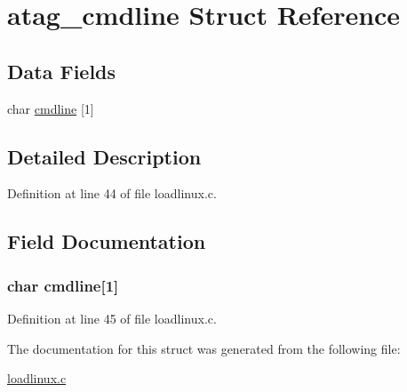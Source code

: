 \hypertarget{structatag__cmdline}{\section{atag\-\_\-cmdline \-Struct \-Reference}
\label{structatag__cmdline}
}
\subsection*{\-Data \-Fields}
\begin{DoxyCompactItemize}
\item 
char \hyperlink{structatag__cmdline_af65a749b1baeb0e29cd855abcac29905}{cmdline} \mbox{[}1\mbox{]}
\end{DoxyCompactItemize}


\subsection{\-Detailed \-Description}


\-Definition at line 44 of file loadlinux.\-c.



\subsection{\-Field \-Documentation}
\hypertarget{structatag__cmdline_af65a749b1baeb0e29cd855abcac29905}{
\subsubsection[{cmdline}]{\setlength{\rightskip}{0pt plus 5cm}char {\bf cmdline}\mbox{[}1\mbox{]}}}\label{structatag__cmdline_af65a749b1baeb0e29cd855abcac29905}


\-Definition at line 45 of file loadlinux.\-c.



\-The documentation for this struct was generated from the following file\-:\begin{DoxyCompactItemize}
\item 
\hyperlink{loadlinux_8c}{loadlinux.\-c}\end{DoxyCompactItemize}
